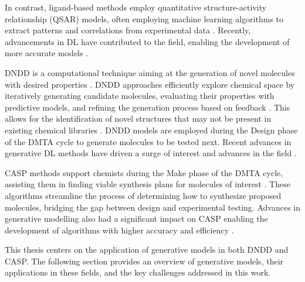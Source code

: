 In contrast, ligand-based methods employ quantitative structure-activity relationship (QSAR) models, often employing
machine learning algorithms to extract patterns and correlations from experimental data \citep{cherkasovQSARModelingWhere2014}.
Recently, advancements in \ac{DL} have contributed to the field, enabling the development of more accurate models
\citep{lusciDeepArchitecturesDeep2013,unterthinerDeepLearningOpportunity2015,chenRiseDeepLearning2018,hochreiterMachineLearningDrug2018,mayrLargescaleComparisonMachine2018,stanleyFSMolFewShotLearning2021,seidlEnhancingActivityPrediction2023}.

\Ac{DNDD} is a computational technique aiming at the generation of novel molecules with desired properties
\citep{schneiderNovoMolecularDesign2013}. \ac{DNDD} approaches efficiently explore chemical space by iteratively
generating candidate molecules, evaluating their properties with predictive models, and refining the generation process
based on feedback \citep{gaoSampleEfficiencyMatters2022}. This allows for the identification of novel structures that
may not be present in existing chemical libraries \citep{brownGuacaMolBenchmarkingModels2019}. \ac{DNDD} models are
employed during the Design phase of the \ac{DMTA} cycle to generate molecules to be tested next. Recent advances in
generative \ac{DL} methods
\citep{bond-taylorDeepGenerativeModelling2022,brownLanguageModelsAre2020,goodfellowGenerativeAdversarialNets2014,
dinhDensityEstimationUsing2017,kingmaAutoEncodingVariationalBayes2013,hoDenoisingDiffusionProbabilistic2020,vaswaniAttentionAllYou2017}
have driven a surge of interest and advances in the field
\citep{eltonDeepLearningMolecular2019,sanchez-lengelingInverseMolecularDesign2018,ekinsIntroductionGenerativeDrug2025}.

\Ac{CASP} methods support chemists during the Make phase of the \ac{DMTA} cycle, assisting them in finding viable
synthesis plans for molecules of interest
\citep{coreyComputerAssistedDesignComplex1969,coreyLogicChemicalSynthesis1989,seglerPlanningChemicalSyntheses2018}.
These algorithms streamline the process of determining how to synthesize proposed molecules, bridging the gap between
design and experimental testing. Advances in generative modelling also had a significant impact 
on \ac{CASP} enabling the development of algorithms with higher accuracy and efficiency
\citep{coleyMachineLearningComputerAided2018,maziarzReevaluatingRetrosynthesisAlgorithms2024}.

This thesis centers on the application of generative models in both \ac{DNDD} and \ac{CASP}. The following section
provides an overview of generative models, their applications in these fields, and the key challenges addressed in this
work.

